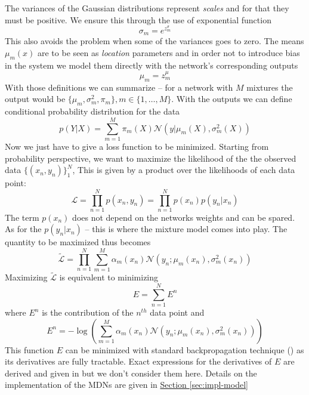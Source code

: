 \documentclass[12pt,a4paper,twoside]{scrartcl}
\numberwithin{equation}{section}
\newcommand{\refsec}[1]{\hyperref[#1]{Section \ref*{#1}}}
\begin{document}
The variances of the Gaussian distributions represent \emph{scales} and for that they must be positive. We ensure this through the use of exponential function
\begin{equation}
  \sigma_m = e^{z_m^{\sigma}}
\end{equation}
This also avoids the problem when some of the variances goes to zero. The means \(\mu_m(x)\) are to be seen as \emph{location} parameters and in order not to introduce bias in the system we model them directly with the network's corresponding outputs
\begin{equation}
  \mu_m = z_m^{\mu} 
\end{equation}
With those definitions we can summarize -- for a network with \(M\) mixtures the output would be \(\{\mu_m, \sigma_m^2, \pi_m \}, m\in\{1,\ldots ,M\}\). With the outputs we can define conditional probability distribution for the data
\begin{equation}
  p(Y|X) = \sum_{m=1}^M \pi_m(X)\mathcal{N}(y|\mu_m(X), \sigma_m^2(X))
\end{equation}
Now we just have to give a loss function to be minimized. Starting from probability perspective, we want to maximize the likelihood of the the observed data \(\{(x_n, y_n)\}_1^N\), This is given by a product over the likelihoods of each data point:
\begin{equation}
  \mathcal{L} = \prod_{n=1}^N p(x_n, y_n) = \prod_{n=1}^N p(x_n)p(y_n | x_n)
\end{equation}
The term \(p(x_n)\) does not depend on the networks weights and can be spared. As for the \(p(y_n | x_n)\) -- this is where the mixture model comes into play. The quantity to be maximized thus becomes
\begin{equation}
  \tilde{\mathcal{L}} =  \prod_{n=1}^N \sum_{m=1}^M \alpha_m(x_n)\mathcal{N}(y_n; \mu_m(x_n), \sigma_m^2(x_n))
\end{equation}
Maximizing \(\tilde{\mathcal{L}}\) is equivalent to minimizing
\begin{equation}
  \label{eq:log-like-sum-1}
  E = \sum_{n=1}^NE^n
\end{equation}
where \(E^n\) is the contribution of the \(n^{th}\) data point and
\begin{equation}
  \label{eq:log-like-sum-2}
  E^n = -\log(\sum_{m=1}^M \alpha_m(x_n)\mathcal{N}(y_n; \mu_m(x_n), \sigma_m^2(x_n)))
\end{equation}
This function \(E\) can be minimized with standard backpropagation technique (\cite{bertels2001}) as its derivatives are fully tractable. Exact expressions for the derivatives of \(E\) are derived and given in \cite{bishop1994} but we don't consider them here. Details on the implementation of the MDNs are given in \refsec{sec:impl-model}
\end{document}
